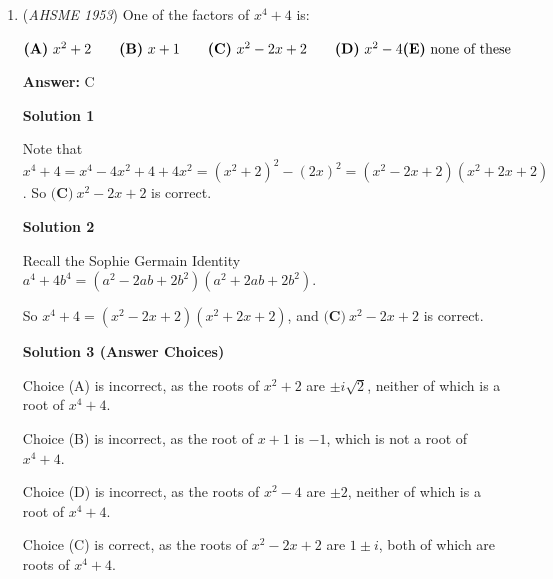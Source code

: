 \begin{enumerate}
 $\textbf{(A)}\ 5\% \qquad \textbf{(B)}\ 4.8\% \qquad \textbf{(C)}\ 5.2\% \qquad \textbf{(D)}\ 4.6\% \qquad \textbf{(E)}\ \text{none of these}$

 \textbf{Answer: }B



\textbf{Solution}

Let $x$ be the amount that was invested at $6\%$, so $4500-x$ was invested at $4\%$.  Then $0.04(4500-x) = 0.06x$.  Solving this equation yields $x = 1800$.  Therefore, the total return on the investments is $0.04\cdot2700+0.06\cdot1800=216$, for an average interest rate of $\frac{216}{4500} = 0.048 = \boxed{\textbf{(B)}\ 4.8\%}$.

 


	\item (\textit{AHSME 1953}) One of the factors of $x^4+4$ is: 


 $\textbf{(A)}\ x^2+2 \qquad \textbf{(B)}\ x+1 \qquad \textbf{(C)}\ x^2-2x+2 \qquad \textbf{(D)}\ x^2-4\\  \textbf{(E)}\ \text{none of these}$

 \textbf{Answer: }C



\textbf{Solution 1}

Note that $x^4 + 4 = x^4 - 4x^2 + 4 + 4x^2 = (x^2 + 2)^2 - (2x)^2 = (x^2 - 2x + 2)(x^2 + 2x + 2)$.  So $\boxed{\textbf{(C)}\ x^2-2x+2}$ is correct.

 



\textbf{Solution 2}

Recall the Sophie Germain Identity $a^4 + 4b^4 = (a^2 - 2ab + 2b^2)(a^2 + 2ab + 2b^2)$.

 So $x^4 + 4 = (x^2-2x+2)(x^2+2x+2)$, and $\boxed{\textbf{(C)}\ x^2-2x+2}$ is correct.

 



\textbf{Solution 3 (Answer Choices)}

Choice (A) is incorrect, as the roots of $x^2 + 2$ are $\pm i\sqrt{2}$, neither of which is a root of $x^4 + 4$.

 Choice (B) is incorrect, as the root of $x + 1$ is $-1$, which is not a root of $x^4 + 4$.

 Choice (D) is incorrect, as the roots of $x^2 - 4$ are $\pm 2$, neither of which is a root of $x^4 + 4$.

 
Choice (C) is correct, as the roots of $x^2 - 2x + 2$ are $1 \pm i$, both of which are roots of $x^4 + 4$. 


\end{enumerate}
